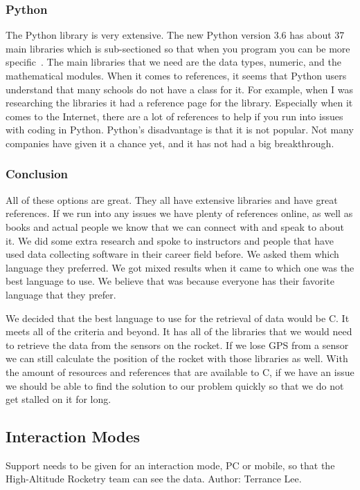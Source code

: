 \documentclass[10pt,draftclsnofoot,onecolumn]{IEEEtran}
\begin{document}
	\subsubsection{Python}
   	The Python library is very extensive. 
	The new Python version 3.6 has about 37 main libraries which is sub-sectioned so that when you program you can be more specific~\cite{the-python-standard-library}.
	The main libraries that we need are the data types, numeric, and the mathematical modules. 
	When it comes to references, it seems that Python users understand that many schools do not have a class for it. 
	For example, when I was researching the libraries it had a reference page for the library. 
	Especially when it comes to the Internet, there are a lot of references to help if you run into issues with coding in Python.
	Python's disadvantage is that it is not popular. 
	Not many companies have given it a chance yet, and it has not had a big breakthrough.  
  
   	
   	\subsubsection{Conclusion}
   	All of these options are great. They all have extensive libraries and have great references. 
	If we run into any issues we have plenty of references online, as well as books and actual people we know that we can connect
	with and speak to about it. 
	We did some extra research and spoke to instructors and people that have used data collecting software in their career field
	before. 
	We asked them which language they preferred. 
	We got mixed results when it came to which one was the best language to use. 
	We believe that was because everyone has their favorite language that they prefer. 
	
   	We decided that the best language to use for the retrieval of data would be C. 
	It meets all of the criteria and beyond. 
	It has all of the libraries that we would need to retrieve the data from the sensors on the rocket. 
	If we lose GPS from a sensor we can still calculate the position of the rocket with those libraries as well. 
	With the amount of resources and references that are available to C, if we have an issue we should be able to find the solution
	to our problem quickly so that we do not get stalled on it for long.  
    
    \subsection{Interaction Modes}
 	Support needs to be given for an interaction mode, PC or mobile, so that the High-Altitude Rocketry team can see the data. Author: Terrance Lee.
\end{document}

